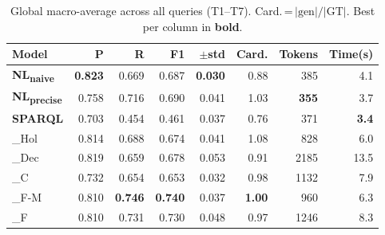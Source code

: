 \begin{table}[t]
\centering\small
\setlength{\tabcolsep}{5pt}
\begin{tabular}{lrrrrrrr}
\toprule
\textbf{Model} & \textbf{P} & \textbf{R} & \textbf{F1} & \textbf{$\pm$std} & \textbf{Card.} & \textbf{Tokens} & \textbf{Time(s)} \\
\midrule
\textbf{NL\textsubscript{naive}} & \textbf{0.823} & 0.669 & 0.687 & \textbf{0.030} & 0.88 & 385 & 4.1 \\
\textbf{NL\textsubscript{precise}} & 0.758 & 0.716 & 0.690 & 0.041 & 1.03 & \textbf{355} & 3.7 \\
\textbf{SPARQL} & 0.703 & 0.454 & 0.461 & 0.037 & 0.76 & 371 & \textbf{3.4} \\
\midrule
\sys{}\_Hol & 0.814 & 0.688 & 0.674 & 0.041 & 1.08 & 828 & 6.0 \\
\sys{}\_Dec & 0.819 & 0.659 & 0.678 & 0.053 & 0.91 & 2185 & 13.5 \\
\sys{}\_C & 0.732 & 0.654 & 0.653 & 0.032 & 0.98 & 1132 & 7.9 \\
\sys{}\_F-M & 0.810 & \textbf{0.746} & \textbf{0.740} & 0.037 & \textbf{1.00} & 960 & 6.3 \\
\sys{}\_F & 0.810 & 0.731 & 0.730 & 0.048 & 0.97 & 1246 & 8.3 \\
\bottomrule
\end{tabular}
\caption{Global macro-average across all queries (T1--T7). Card.\,=\,$|\mathrm{gen}|/|\mathrm{GT}|$. Best per column in \textbf{bold}.}
\label{tab:global}
\end{table}